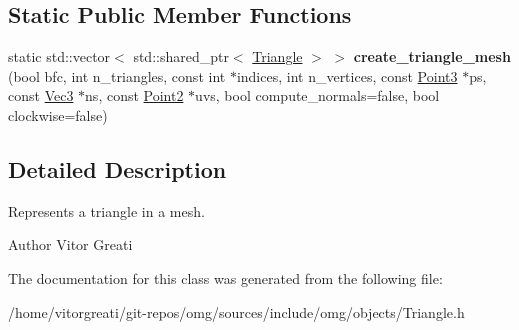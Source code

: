 \subsection*{Static Public Member Functions}
\begin{DoxyCompactItemize}
\item 
\mbox{\label{classomg_1_1_triangle_add80a128602d2be0f1fda612725b633c}} 
static std\+::vector$<$ std\+::shared\+\_\+ptr$<$ \mbox{\hyperlink{classomg_1_1_triangle}{Triangle}} $>$ $>$ {\bfseries create\+\_\+triangle\+\_\+mesh} (bool bfc, int n\+\_\+triangles, const int $\ast$indices, int n\+\_\+vertices, const \mbox{\hyperlink{namespaceomg_af85242d35fdacf829d32a6f9b95f3e35}{Point3}} $\ast$ps, const \mbox{\hyperlink{namespaceomg_a45a9482677fee9933ff369b49894e316}{Vec3}} $\ast$ns, const \mbox{\hyperlink{namespaceomg_a18e42fb7bbc4159e9137145b866ec578}{Point2}} $\ast$uvs, bool compute\+\_\+normals=false, bool clockwise=false)
\end{DoxyCompactItemize}


\subsection{Detailed Description}
Represents a triangle in a mesh. 

\begin{DoxyAuthor}{Author}
Vitor Greati 
\end{DoxyAuthor}


The documentation for this class was generated from the following file\+:\begin{DoxyCompactItemize}
\item 
/home/vitorgreati/git-\/repos/omg/sources/include/omg/objects/Triangle.\+h\end{DoxyCompactItemize}
